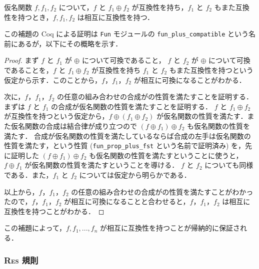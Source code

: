 \begin{lem}
  仮名関数 $f, f_1, f_2$ について，$f$ と $f_1 \oplus f_2$ が互換性を持ち，$f_1$ と $f_2$ もまた互換性を持つとき，$f, f_1, f_2$ は相互に互換性を持つ．
  \label{lem:compatible}
\end{lem}

この補題の Coq による証明は \texttt{Fun} モジュールの \texttt{fun\_plus\_compatible} という名前にあるが，以下にその概略を示す．

\begin{proof}
  まず $f$ と $f_1$ が $\oplus$ について可換であること， $f$ と $f_2$ が $\oplus$ について可換であることを，$f$ と $f_1 \oplus f_2$ が互換性を持ち $f_1$ と $f_2$ もまた互換性を持つという仮定から示す．このことから，$f$，$f_1$，$f_2$ が相互に可換になることがわかる．

  次に，$f$，$f_1$，$f_2$ の任意の組み合わせの合成が\tmp の性質を満たすことを証明する．まずは $f$ と $f_1$ の合成が仮名関数の性質を満たすことを証明する．
  $f$ と $f_1 \oplus f_2$ が互換性を持つという仮定から，$f \oplus (f_1 \oplus f_2)$ が仮名関数の性質を満たす．また仮名関数の合成は結合律が成り立つので $(f \oplus f_1) \oplus f_2$ も仮名関数の性質を満たす．
  合成が仮名関数の性質を満たしているならば合成の左手は仮名関数の性質を満たす，という性質 (\texttt{fun\_prop\_plus\_fst} という名前で証明済み) を，先に証明した $(f \oplus f_1) \oplus f_2$ も仮名関数の性質を満たすということに使うと，$f \oplus f_1$ が仮名関数の性質を満たすということを導ける．
  $f$ と $f_2$ についても同様である．また，$f_1$ と $f_2$ については仮定から明らかである．

  以上から，$f$，$f_1$，$f_2$ の任意の組み合わせの合成が\tmp の性質を満たすことがわかったので，$f$，$f_1$，$f_2$ が相互に可換になることと合わせると，$f$，$f_1$，$f_2$ は相互に互換性を持つことがわかる．
\end{proof}

この補題によって，$f, f_1, ... , f_n$ が相互に互換性を持つことが帰納的に保証される．%



\subsubsection{\textsc{Res} 規則}

